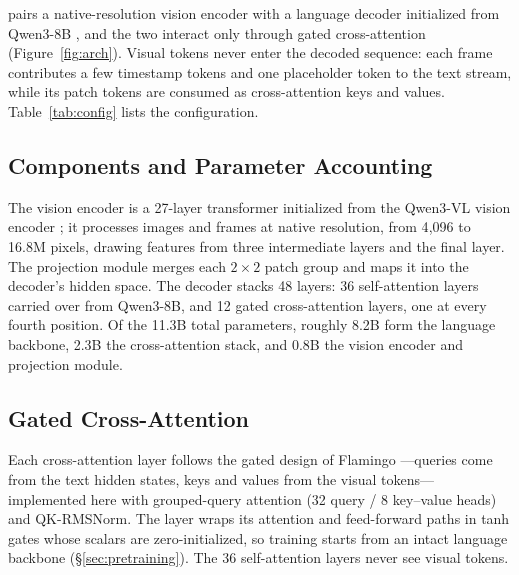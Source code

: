 \begin{table}[t]
  \centering
  \caption{Released \mossvl{} checkpoints. The 0708 run is the subject of
  this report: \mossbase{} is the pre-trained model, \mossinstruct{} is its
  instruction-tuned successor, and \mossrealtime{} continues training from
  \mossinstruct{} with Realtime-SFT. The 0408 checkpoints are an earlier,
  independently trained run of the same architecture, released alongside
  for research continuity. All five are available under the OpenMOSS-Team
  organization on HuggingFace.}
  \label{tab:lineage}
  
\end{table}


\mossvl{} pairs a native-resolution vision encoder with a language
decoder initialized from Qwen3-8B \citep{Yang2025qwen}, and the two
interact only through gated cross-attention (Figure~\ref{fig:arch}).
Visual tokens never enter the decoded sequence: each frame contributes
a few timestamp tokens and one placeholder token to the text stream,
while its patch tokens are consumed as cross-attention keys and values.
Table~\ref{tab:config} lists the configuration.

\subsection{Components and Parameter Accounting}\label{sec:arch-components}

The vision encoder is a 27-layer transformer initialized from the
Qwen3-VL vision encoder \citep{Bai2025qwen}; it processes images and
frames at native resolution, from 4{,}096 to 16.8M pixels, drawing
features from three intermediate layers and the final layer. The
projection module merges each $2\times2$ patch group and maps it into
the decoder's hidden space. The decoder stacks 48 layers: 36
self-attention layers carried over from Qwen3-8B, and 12 gated
cross-attention layers, one at every fourth position. Of the 11.3B
total parameters, roughly 8.2B form the language backbone, 2.3B the
cross-attention stack, and 0.8B the vision encoder and projection
module.

\subsection{Gated Cross-Attention}\label{sec:xattn}

Each cross-attention layer follows the gated design of Flamingo
\citep{Alayrac2022flamingo}---queries come from the text hidden
states, keys and values from the visual tokens---implemented here
with grouped-query attention (32 query / 8 key--value heads) and
QK-RMSNorm. The layer wraps its
attention and feed-forward paths in tanh gates whose scalars are
zero-initialized, so training starts from an intact language backbone
(\S\ref{sec:pretraining}). The 36 self-attention layers never see
visual tokens.

